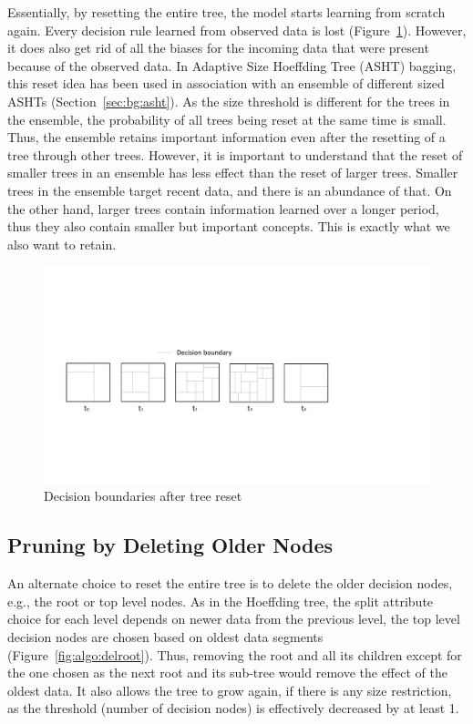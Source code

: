Essentially, by resetting the entire tree, the model starts learning from scratch again. Every decision rule learned from observed data is lost (Figure~\ref{fig:algo:resetdb}). However, it does also get rid of all the biases for the incoming data that were present because of the observed data. In Adaptive Size Hoeffding Tree (ASHT) bagging, this reset idea has been used in association with an ensemble of different sized ASHTs (Section~\ref{sec:bg:asht}). As the size threshold is different for the trees in the ensemble, the probability of all trees being reset at the same time is small. Thus, the ensemble retains important information even after the resetting of a tree through other trees. However, it is important to understand that the reset of smaller trees in an ensemble has less effect than the reset of larger trees. Smaller trees in the ensemble target recent data, and there is an abundance of that. On the other hand, larger trees contain information learned over a longer period, thus they also contain smaller but important concepts. This is exactly what we also want to retain.

\begin{figure}[htbp]
    \begin{center}
        \includegraphics[width=14.0cm]{figs/resetdb.pdf}
        \caption{Decision boundaries after tree reset}
        \label{fig:algo:resetdb}
    \end{center}
\end{figure}

\subsection{Pruning by Deleting Older Nodes}
An alternate choice to reset the entire tree is to delete the older decision nodes, e.g., the root or top level nodes. As in the Hoeffding tree, the split attribute choice for each level depends on newer data from the previous level, the top level decision nodes are chosen based on oldest data segments (Figure~\ref{fig:algo:delroot}). Thus, removing the root and all its children except for the one chosen as the next root and its sub-tree would remove the effect of the oldest data. It also allows the tree to grow again, if there is any size restriction, as the threshold (number of decision nodes) is effectively decreased by at least 1.

